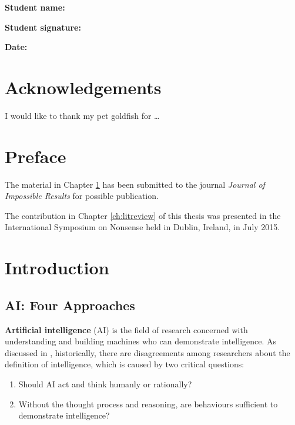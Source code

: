 \documentclass{monashthesis}
\theoremstyle{definition}
\theoremstyle{definition}
\theoremstyle{definition}
\theoremstyle{definition}
\theoremstyle{remark}
\begin{document}
\textbf{Student name:} \authorname

\textbf{Student signature:}

\textbf{Date:}

\hypertarget{acknowledgements}{%
\chapter*{Acknowledgements}\label{acknowledgements}}

I would like to thank my pet goldfish for \dots

\hypertarget{preface}{%
\chapter*{Preface}\label{preface}}

The material in Chapter \ref{ch:intro} has been submitted to the journal \emph{Journal of Impossible Results} for possible publication.

The contribution in Chapter \ref{ch:litreview} of this thesis was presented in the International Symposium on Nonsense held in Dublin, Ireland, in July 2015.

\clearpage{}\setcounter{page}{0}

\hypertarget{ch:intro}{%
\chapter{Introduction}\label{ch:intro}}

\hypertarget{ai-four-approaches}{%
\section{AI: Four Approaches}\label{ai-four-approaches}}

\textbf{Artificial intelligence} (AI) is the field of research concerned with understanding and building machines who can demonstrate intelligence. As discussed in \textcite{russell_artificial_2002}, historically, there are disagreements among researchers about the definition of intelligence, which is caused by two critical questions:

\begin{enumerate}
\def\labelenumi{\arabic{enumi}.}
\tightlist
\item
  Should AI act and think humanly or rationally?
\item
  Without the thought process and reasoning, are behaviours sufficient to demonstrate intelligence?
\end{enumerate}
\end{document}
